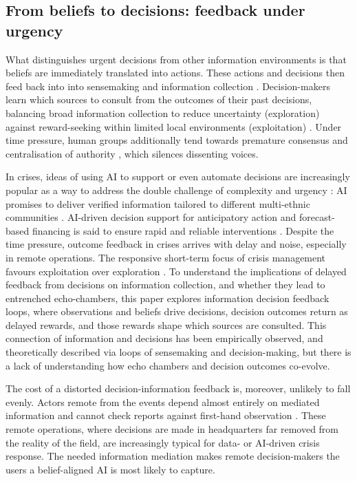 \documentclass[pdflatex,sn-basic]{sn-jnl}
\begin{document}
\subsection{From beliefs to decisions: feedback under urgency}\label{sec:decision}

What distinguishes urgent decisions from other information environments is that beliefs are immediately translated into actions. These  actions and decisions then feed back into
into sensemaking and information collection \citep{gralla2016problem}. Decision-makers learn which sources to consult from the outcomes of their past decisions, balancing broad information collection to reduce uncertainty (exploration) against reward-seeking within limited local environments (exploitation)
\citep{march1991exploration}. Under time pressure, human groups additionally tend towards premature consensus and centralisation of authority \citep{driskell1991group}, 
which silences dissenting voices.
 
In crises, ideas of using AI to support or even automate decisions are increasingly popular as a way to address the double challenge of complexity and urgency \citep{comes2024ai}: 
AI promises to deliver verified information tailored to different multi-ethnic communities \citep{zhao2025tailoring}. AI-driven decision support for anticipatory action and forecast-based financing is said to ensure rapid and reliable interventions \citep{thalheimer2022role}. Despite the time pressure, outcome feedback in crises arrives with delay and noise, especially in remote operations. The responsive short-term focus of crisis management favours exploitation over exploration
\citep{comes2020coordination}. 
To understand the implications of delayed feedback from decisions on information collection, and whether they lead to entrenched echo-chambers, this paper explores information decision feedback loops, where observations and beliefs drive decisions, decision outcomes return as delayed rewards, and those rewards shape which sources are consulted. This connection of information and decisions has been empirically observed, and theoretically described via loops of sensemaking and decision-making, but there is a lack of understanding how echo chambers and decision outcomes co-evolve. 
 
The cost of a distorted decision-information feedback is, moreover, unlikely to fall evenly. Actors remote from the events depend almost
entirely on mediated information and cannot check reports against first-hand observation \citep{holguinveras2012unique,comes2020coordination}. These remote operations, where decisions are made in headquarters far removed from the reality of the field, are increasingly typical for data- or AI-driven crisis response. The needed information mediation makes remote decision-makers the users a belief-aligned AI is most likely to capture. 
\end{document}
